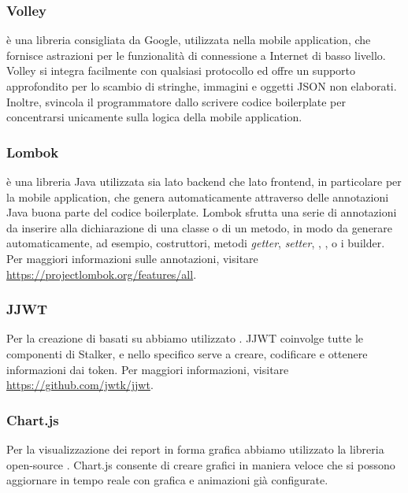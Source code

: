 \documentclass[../../manuale-manutentore.tex]{subfiles}
\begin{document}
\subsubsection{Volley}%
\label{subs:volley}

 è una libreria consigliata da Google, utilizzata nella mobile application, che fornisce astrazioni per le funzionalità di connessione a Internet di basso livello.
Volley si integra facilmente con qualsiasi protocollo ed offre un supporto approfondito per lo scambio di stringhe, immagini e oggetti JSON non elaborati.
Inoltre, svincola il programmatore dallo scrivere codice boilerplate per concentrarsi unicamente sulla logica della mobile application.

\subsubsection{Lombok}%
\label{subs:lombok}

 è una libreria Java utilizzata sia lato backend che lato frontend, in particolare per la mobile application, che genera automaticamente attraverso delle annotazioni Java buona parte del codice boilerplate.
Lombok sfrutta una serie di annotazioni da inserire alla dichiarazione di una classe o di un metodo, in modo da generare automaticamente, ad esempio, costruttori, metodi \textit{getter}, \textit{setter}, , , o i builder.
Per maggiori informazioni sulle annotazioni, visitare \href{https://projectlombok.org/features/all}{https://projectlombok.org/features/all}.

\subsubsection{JJWT}%
\label{subs:jjwt}

Per la creazione di  basati su  abbiamo utilizzato .
JJWT coinvolge tutte le componenti di Stalker, e nello specifico serve a creare, codificare e ottenere informazioni dai token.
Per maggiori informazioni, visitare \href{https://github.com/jwtk/jjwt}{https://github.com/jwtk/jjwt}.

\subsubsection{Chart.js}%
\label{subs:chartjs}

Per la visualizzazione dei report in forma grafica abbiamo utilizzato la libreria open-source .
Chart.js consente di creare grafici in maniera veloce che si possono aggiornare in tempo reale con grafica e animazioni già configurate.
\end{document}
